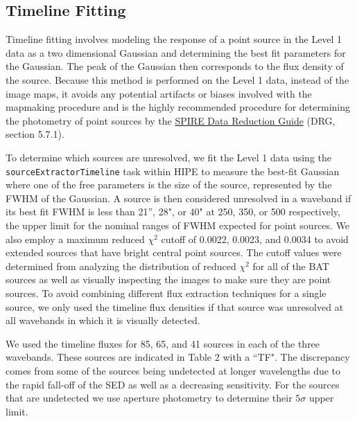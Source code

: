 \subsection{Timeline Fitting}\label{timeline}
Timeline fitting involves modeling the response of a point source in the Level 1 data as a two dimensional Gaussian and determining the best fit parameters for the Gaussian. The peak of the Gaussian then corresponds to the flux density of the source. Because this method is performed on the Level 1 data, instead of the image maps, it avoids any potential artifacts or biases involved with the mapmaking procedure and is the highly recommended procedure for determining the photometry of point sources by the \href{http://herschel.esac.esa.int/hcss-doc-11.0/index.jsp\#spire_drg:_start}{SPIRE Data Reduction Guide} (DRG, section 5.7.1).

To determine which sources are unresolved, we fit the Level 1 data using the \texttt{sourceExtractorTimeline} task within HIPE to measure the best-fit Gaussian where one of the free parameters is the size of the source, represented by the FWHM of the Gaussian. A source is then considered unresolved in a waveband if its best fit FWHM is less than 21'', 28", or 40" at 250, 350, or 500 \um{} respectively, the upper limit for the nominal ranges of FWHM expected for point sources. We also employ a maximum reduced $\chi^{2}$ cutoff of 0.0022, 0.0023, and 0.0034 to avoid extended sources that have bright central point sources. The cutoff values were determined from analyzing the distribution of reduced $\chi^{2}$ for all of the BAT sources as well as visually inspecting the images to make sure they are point sources. To avoid combining different flux extraction techniques for a single source, we only used the timeline flux densities if that source was unresolved at all wavebands in which it is visually detected.

We used the timeline fluxes for 85, 65, and 41 sources in each of the three wavebands. These sources are indicated in Table 2 with a ``TF". The discrepancy comes from some of the sources being undetected at longer wavelengths due to the rapid fall-off of the SED as well as a decreasing sensitivity. For the sources that are undetected we use aperture photometry to determine their $5\sigma$ upper limit. 

  